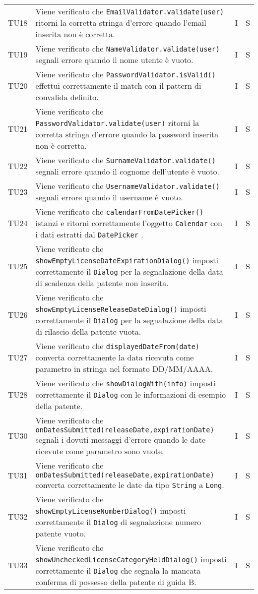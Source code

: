 \begin{longtable}{ >{\centering}p{}  >{\centering}p{} >{\centering}p{}
			>{\centering}p{}}
		\tabularnewline	
		TU18 & Viene verificato che \texttt{EmailValidator.validate(user)} ritorni la corretta stringa d'errore quando l'email inserita non è corretta. & I & S
		\tabularnewline	
		TU19 & Viene verificato che \texttt{NameValidator.validate(user)} segnali errore quando il nome utente è vuoto. & I & S
		\tabularnewline	
		TU20 & Viene verificato che \texttt{PasswordValidator.isValid()} effettui correttamente il match con il pattern di convalida definito. & I & S
		\tabularnewline	
		TU21 & Viene verificato che \texttt{PasswordValidator.validate(user)} ritorni la corretta stringa d'errore quando la password inserita non è corretta. & I & S
		\tabularnewline	
		TU22 & Viene verificato che \texttt{SurnameValidator.validate()} segnali errore quando il cognome dell'utente è vuoto. & I & S
		\tabularnewline	
		TU23 & Viene verificato che \texttt{UsernameValidator.validate()} segnali errore quando il username è vuoto. & I & S
		\tabularnewline	
		TU24 & Viene verificato che \texttt{calendarFromDatePicker()} istanzi e ritorni correttamente l'oggetto \texttt{Calendar} con i dati estratti dal \texttt{DatePicker} . & I & S
		\tabularnewline	
		TU25 & Viene verificato che \texttt{showEmptyLicenseDateExpirationDialog()} imposti correttamente il \texttt{Dialog} per la segnalazione della data di scadenza della patente non inserita. & I & S
		\tabularnewline	
		TU26 & Viene verificato che \texttt{showEmptyLicenseReleaseDateDialog()} imposti correttamente il \texttt{Dialog} per la segnalazione della data di rilascio della patente vuota. & I & S
		\tabularnewline	
		TU27 & Viene verificato che \texttt{displayedDateFrom(date)} converta correttamente la data ricevuta come parametro in stringa nel formato DD/MM/AAAA. & I & S
		\tabularnewline	
		TU28 & Viene verificato che \texttt{showDialogWith(info)} imposti correttamente il \texttt{Dialog} con le informazioni di esempio della patente. & I & S
		\tabularnewline	
		TU30 & Viene verificato che \texttt{onDatesSubmitted(releaseDate,expirationDate)} segnali i dovuti messaggi d'errore quando le date ricevute come parametro sono vuote. & I & S
		\tabularnewline	
		TU31 & Viene verificato che \texttt{onDatesSubmitted(releaseDate,expirationDate)} converta correttamente le date da tipo \texttt{String} a \texttt{Long}. & I & S
		\tabularnewline	
		TU32 & Viene verificato che \texttt{showEmptyLicenseNumberDialog()} imposti correttamente il \texttt{Dialog} di segnalazione numero patente vuoto. & I & S
		\tabularnewline	
		TU33 & Viene verificato che \texttt{showUncheckedLicenseCategoryHeldDialog()} imposti correttamente il \texttt{Dialog} che segnala la mancata conferma di possesso della patente di guida B. & I & S

\end{longtable}

